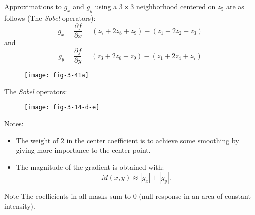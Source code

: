 
\begin{frame}
Approximations to $g_{x}$ and $g_{y}$ using a $3\times 3$ neighborhood centered on $z_{5}$ are as follows (The \textit{Sobel} operators):
\begin{equation}
g_{x} = \dfrac{\partial f}{\partial x} = (z_{7} + 2z_{8} + z_{9} ) - (z_{1} + 2z_{2} + z_{3} )
\end{equation}
and
\begin{equation}
g_{y} = \dfrac{\partial f}{\partial y} = (z_{3} + 2z_{6} + z_{9} ) - (z_{1} + 2z_{4} + z_{7} )
\end{equation}
\begin{figure}
\centering
\texttt{[image: fig-3-41a]}
\end{figure}
\end{frame}


\begin{frame}
The \textit{Sobel} operators:
\begin{figure}
\centering
\texttt{[image: fig-3-14-d-e]}
\end{figure}
Notes:
\begin{itemize}
\item The weight of $2$ in the center coefficient is to achieve some smoothing by giving more importance to the center point.
\item The magnitude of the gradient is obtained with:
\begin{equation}
M(x,y) \approx |g_{x}| + |g_{y}|.
\end{equation}
\end{itemize}
\end{frame}


\begin{frame}
\begin{block}{Note}
The coefficients in all masks sum to 0 (null response in an area of constant intensity).
\end{block}
\end{frame}


